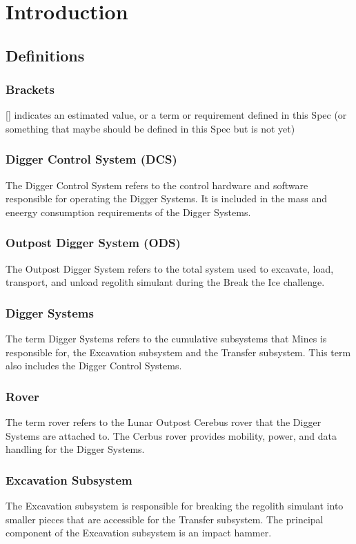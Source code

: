 \newpage
\section{Introduction}
\subsection{Definitions}
\subsubsection{Brackets}
[] indicates an estimated value, or a term or requirement defined in this Spec (or something that maybe should be defined in this Spec but is not yet)
\subsubsection{Digger Control System (DCS)}
The Digger Control System refers to the control hardware and software responsible for operating the Digger Systems. It is included in the mass and eneergy consumption requirements of the Digger Systems. 
\subsubsection{Outpost Digger System (ODS)}
The Outpost Digger System refers to the total system used to excavate, load, transport, and unload regolith simulant during the Break the Ice challenge. 
\subsubsection{Digger Systems}
The term Digger Systems refers to the cumulative subsystems that Mines is responsible for, the Excavation subsystem and the Transfer subsystem. This term also includes the Digger Control Systems.
\subsubsection{Rover}
The term rover refers to the Lunar Outpost Cerebus rover that the Digger Systems are attached to. The Cerbus rover provides mobility, power, and data handling for the Digger Systems.
\subsubsection{Excavation Subsystem}
The Excavation subsystem is responsible for breaking the regolith simulant into smaller pieces that are accessible for the Transfer subsystem. The principal component of the Excavation subsystem is an impact hammer.
